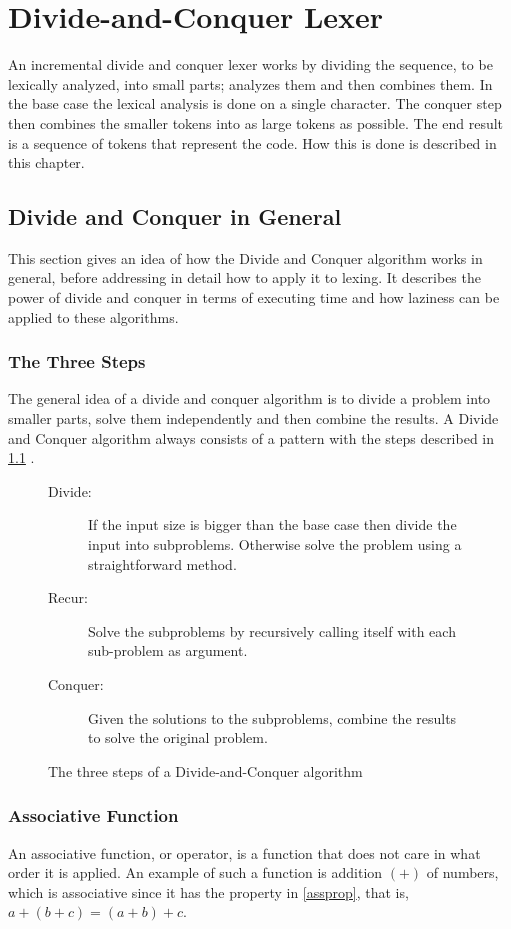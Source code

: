 \chapter{Divide-and-Conquer Lexer \label{chap:divconqlexer}}
An incremental divide and conquer lexer works by dividing the sequence, to be
lexically analyzed, into small parts; analyzes them and then combines them.
In the base case the lexical analysis is done on a single character. The
conquer step then combines the smaller tokens into as large tokens as possible.
The end result is a sequence of tokens that represent the code. How this is done
is described in this chapter.

\section{Divide and Conquer in General \label{sec:divconq}}
This section gives an idea of how the Divide and Conquer algorithm
works in general, before addressing in detail how to apply it to lexing. It
describes the power of divide and conquer in terms of executing time and how
laziness can be applied to these algorithms.

\subsection{The Three Steps}
The general idea of a divide and conquer algorithm is to divide a problem into
smaller parts, solve them independently and then combine the results. A Divide
and Conquer algorithm always consists of a pattern with the steps described in
\cref{fig:divconqsteps} \cite{Goodrich}.

\begin{figure}
\begin{description}
\item[Divide:] If the input size is bigger than the base case then divide the
input into subproblems. Otherwise solve the problem using a straightforward
method.
\item[Recur:] Solve the subproblems by recursively calling itself with each
sub-problem as argument.
\item[Conquer:] Given the solutions to the subproblems, combine the results to
solve the original problem.
\end{description}
\caption{The three steps of a Divide-and-Conquer algorithm \label{fig:divconqsteps}}
\end{figure}

\subsection{Associative Function}
An associative function, or operator, is a function that does not care in what
order it is applied. An example of such a function is addition $(+)$ of numbers,
which is associative since it has the property in \cref{assprop}, that is,
$a+(b+c)=(a+b)+c$.

